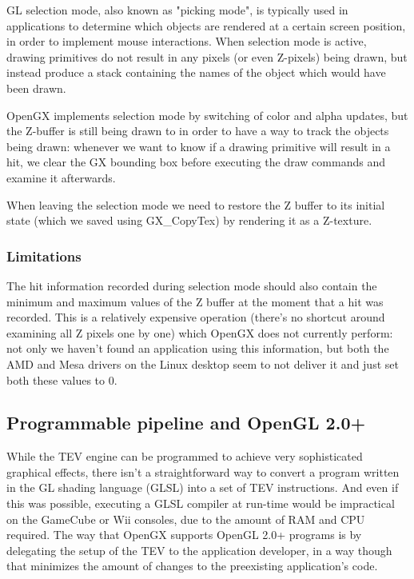 \documentclass[12pt]{article}
\begin{document}
GL selection mode, also known as "picking mode", is typically used in applications to determine which objects are rendered at a certain screen position, in order to implement mouse interactions. When selection mode is active, drawing primitives do not result in any pixels (or even Z-pixels) being drawn, but instead produce a stack containing the names of the object which would have been drawn.

OpenGX implements selection mode by switching of color and alpha updates, but the Z-buffer is still being drawn to in order to have a way to track the objects being drawn: whenever we want to know if a drawing primitive will result in a hit, we clear the GX bounding box before executing the draw commands and examine it afterwards.

When leaving the selection mode we need to restore the Z buffer to its initial state (which we saved using GX\_CopyTex) by rendering it as a Z-texture.

\subsubsection {Limitations}

The hit information recorded during selection mode should also contain the minimum and maximum values of the Z buffer at the moment that a hit was recorded. This is a relatively expensive operation (there's no shortcut around examining all Z pixels one by one) which OpenGX does not currently perform: not only we haven't found an application using this information, but both the AMD and Mesa drivers on the Linux desktop seem to not deliver it and just set both these values to 0.


\subsection {Programmable pipeline and OpenGL 2.0+}

While the TEV engine can be programmed to achieve very sophisticated graphical effects, there isn't a straightforward way to convert a program written in the GL shading language (GLSL) into a set of TEV instructions. And even if this was possible, executing a GLSL compiler at run-time would be impractical on the GameCube or Wii consoles, due to the amount of RAM and CPU required. The way that OpenGX supports OpenGL 2.0+ programs is by delegating the setup of the TEV to the application developer, in a way though that minimizes the amount of changes to the preexisting application's code.
\end{document}
